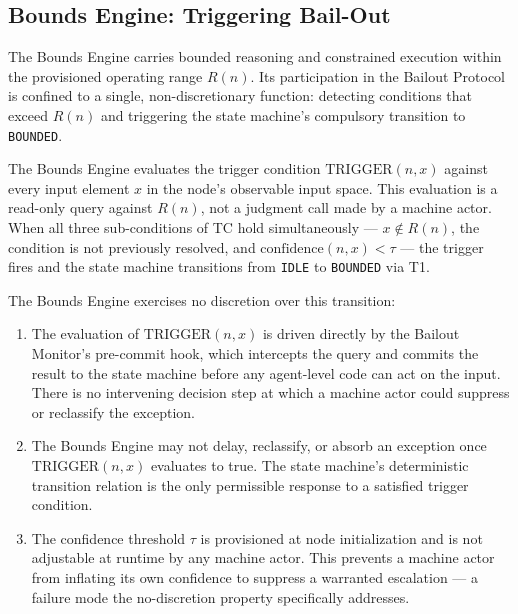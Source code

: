 \subsection{Bounds Engine: Triggering Bail-Out}\label{sec:bounds-trigger}

The Bounds Engine carries bounded reasoning and constrained execution within the provisioned operating range $R(n)$. Its participation in the Bailout Protocol is confined to a single, non-discretionary function: detecting conditions that exceed $R(n)$ and triggering the state machine's compulsory transition to \texttt{BOUNDED}.

The Bounds Engine evaluates the trigger condition $\text{TRIGGER}(n, x)$ against every input element $x$ in the node's observable input space. This evaluation is a read-only query against $R(n)$, not a judgment call made by a machine actor. When all three sub-conditions of TC hold simultaneously --- $x \notin R(n)$, the condition is not previously resolved, and $\text{confidence}(n, x) < \tau$ --- the trigger fires and the state machine transitions from \texttt{IDLE} to \texttt{BOUNDED} via T1.

The Bounds Engine exercises no discretion over this transition:

\begin{enumerate}\itemsep=0pt
\item The evaluation of $\text{TRIGGER}(n, x)$ is driven directly by the Bailout Monitor's pre-commit hook, which intercepts the query and commits the result to the state machine before any agent-level code can act on the input. There is no intervening decision step at which a machine actor could suppress or reclassify the exception.

\item The Bounds Engine may not delay, reclassify, or absorb an exception once $\text{TRIGGER}(n, x)$ evaluates to true. The state machine's deterministic transition relation is the only permissible response to a satisfied trigger condition.

\item The confidence threshold $\tau$ is provisioned at node initialization and is not adjustable at runtime by any machine actor. This prevents a machine actor from inflating its own confidence to suppress a warranted escalation --- a failure mode the no-discretion property specifically addresses.
\end{enumerate}


